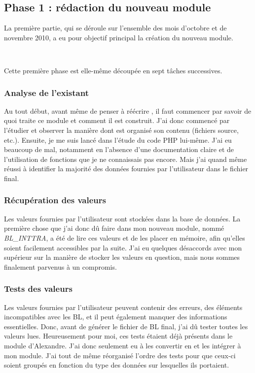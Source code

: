 \subsection{Phase 1 : rédaction du nouveau module}
La première partie, qui se déroule sur l'ensemble des mois d'octobre et de novembre 2010, a eu pour objectif principal la création du nouveau module.

~

Cette première phase est elle-même découpée en sept tâches successives.

\subsubsection{Analyse de l'existant}
Au tout début, avant même de penser à réécrire \pireus, il faut commencer par savoir de quoi traite ce module et comment il est construit. J'ai donc commencé par l'étudier et observer la manière dont est organisé son contenu (fichiers source, etc.). Ensuite, je me suis lancé dans l'étude du code PHP lui-même. J'ai eu beaucoup de mal, notamment en l'absence d'une documentation claire et de l'utilisation de fonctions que je ne connaissais pas encore. Mais j'ai quand même réussi à identifier la majorité des données fournies par l'utilisateur dans le fichier final.

\subsubsection{Récupération des valeurs}
Les valeurs fournies par l'utilisateur sont stockées dans la base de données. La première chose que j'ai donc dû faire dans mon nouveau module, nommé \emph{BL\_INTTRA}, a été de lire ces valeurs et de les placer en mémoire, afin qu'elles soient facilement accessibles par la suite. J'ai eu quelques désaccords avec mon supérieur sur la manière de stocker les valeurs en question, mais nous sommes finalement parvenus à un compromis.

\subsubsection{Tests des valeurs}
Les valeurs fournies par l'utilisateur peuvent contenir des erreurs, des éléments incompatibles avec les BL, et il peut également manquer des informations essentielles. Donc, avant de générer le fichier de BL final, j'ai dû tester toutes les valeurs lues. Heureusement pour moi, ces tests étaient déjà présents dans le module d'Alexandre. J'ai donc seulement eu à les convertir en \vb{} et les intégrer à mon module. J'ai tout de même réorganisé l'ordre des tests pour que ceux-ci soient groupés en fonction du type des données sur lesquelles ils portaient.

